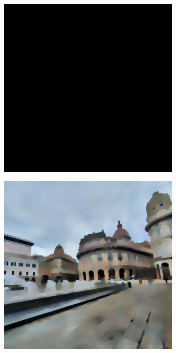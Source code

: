 \begin{figure}
\begin{minipage}{\textwidth}%
\begin{subfigure}{.3\textwidth}%
\includegraphics[width=\textwidth]{atelier/breg_cat/cat-0.png}
\end{subfigure}\hfill%
\begin{subfigure}{.3\textwidth}%
\includegraphics[width=\textwidth]{atelier/breg_cat/cat-10.png}

\end{subfigure}
\end{minipage}
\end{figure}
